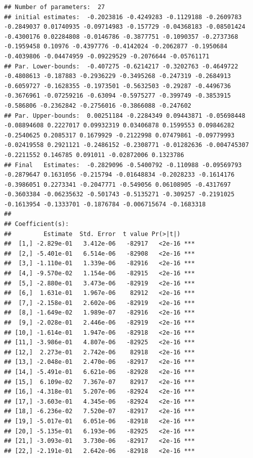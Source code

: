 \documentclass[]{article}
\begin{document}
\begin{verbatim}
## Number of parameters:  27 
## initial estimates:  -0.2023816 -0.4249283 -0.1129188 -0.2609783 -0.2849037 0.01740935 -0.09714983 -0.157729 -0.04368183 -0.08501424 -0.4300176 0.02284808 -0.0146786 -0.3877751 -0.1090357 -0.2737368 -0.1959458 0.10976 -0.4397776 -0.4142024 -0.2062877 -0.1950684 -0.4039806 -0.04474959 -0.09229529 -0.2076644 -0.05761171 
## Par. Lower-bounds:  -0.407275 -0.6214217 -0.3202763 -0.4649722 -0.4808613 -0.187883 -0.2936229 -0.3495268 -0.247319 -0.2684913 -0.6059727 -0.1628355 -0.1973501 -0.5632503 -0.29287 -0.4496736 -0.3676961 -0.07259216 -0.63094 -0.5975277 -0.399749 -0.3853915 -0.586806 -0.2362842 -0.2756016 -0.3866088 -0.247602 
## Par. Upper-bounds:  0.00251184 -0.2284349 0.09443871 -0.05698448 -0.08894608 0.2227017 0.09932319 0.03406878 0.1599553 0.09846282 -0.2540625 0.2085317 0.1679929 -0.2122998 0.07479861 -0.09779993 -0.02419558 0.2921121 -0.2486152 -0.2308771 -0.01282636 -0.004745307 -0.2211552 0.146785 0.091011 -0.02872006 0.1323786 
## Final   Estimates:  -0.2829096 -0.5400792 -0.110988 -0.09569793 -0.2879647 0.1631056 -0.215794 -0.01648834 -0.2028233 -0.1614176 -0.3986051 0.2273341 -0.2047771 -0.549056 0.06108905 -0.4317697 -0.3603384 -0.06235632 -0.501743 -0.5135271 -0.309257 -0.2191025 -0.1613954 -0.1333701 -0.1876784 -0.006715674 -0.1683318 
## 
## Coefficient(s):
##         Estimate  Std. Error  t value Pr(>|t|)    
##  [1,] -2.829e-01   3.412e-06   -82917   <2e-16 ***
##  [2,] -5.401e-01   6.514e-06   -82908   <2e-16 ***
##  [3,] -1.110e-01   1.339e-06   -82916   <2e-16 ***
##  [4,] -9.570e-02   1.154e-06   -82915   <2e-16 ***
##  [5,] -2.880e-01   3.473e-06   -82919   <2e-16 ***
##  [6,]  1.631e-01   1.967e-06    82912   <2e-16 ***
##  [7,] -2.158e-01   2.602e-06   -82919   <2e-16 ***
##  [8,] -1.649e-02   1.989e-07   -82916   <2e-16 ***
##  [9,] -2.028e-01   2.446e-06   -82919   <2e-16 ***
## [10,] -1.614e-01   1.947e-06   -82918   <2e-16 ***
## [11,] -3.986e-01   4.807e-06   -82925   <2e-16 ***
## [12,]  2.273e-01   2.742e-06    82918   <2e-16 ***
## [13,] -2.048e-01   2.470e-06   -82917   <2e-16 ***
## [14,] -5.491e-01   6.621e-06   -82928   <2e-16 ***
## [15,]  6.109e-02   7.367e-07    82917   <2e-16 ***
## [16,] -4.318e-01   5.207e-06   -82924   <2e-16 ***
## [17,] -3.603e-01   4.345e-06   -82924   <2e-16 ***
## [18,] -6.236e-02   7.520e-07   -82917   <2e-16 ***
## [19,] -5.017e-01   6.051e-06   -82918   <2e-16 ***
## [20,] -5.135e-01   6.193e-06   -82925   <2e-16 ***
## [21,] -3.093e-01   3.730e-06   -82917   <2e-16 ***
## [22,] -2.191e-01   2.642e-06   -82918   <2e-16 ***

\end{verbatim}
\end{document}
